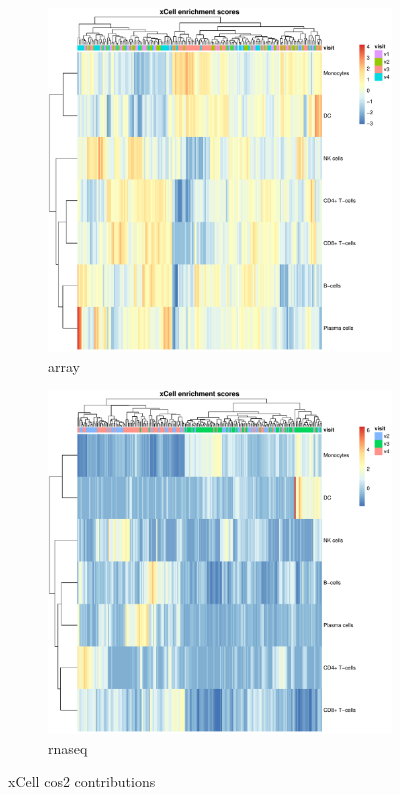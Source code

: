 \begin{figure}
    \centering
    \begin{subfigure}[b]{0.49\textwidth}
        \centering
        \includegraphics[width=1.0\textwidth,page=8]{mainmatter/figures/chapter_03/get_xCell_estimates.dataset_array.plots.pdf}
        \caption{array}
    \end{subfigure}%
    \hfill%
    \begin{subfigure}[b]{0.49\textwidth}
        \centering
        \includegraphics[width=1.0\textwidth,page=8]{mainmatter/figures/chapter_03/get_xCell_estimates.dataset_rnaseq.plots.pdf}
        \caption{rnaseq}
    \end{subfigure}%
    \caption{xCell cos2 contributions}
    \label{fig:hird_xCell_loadings}
\end{figure}


